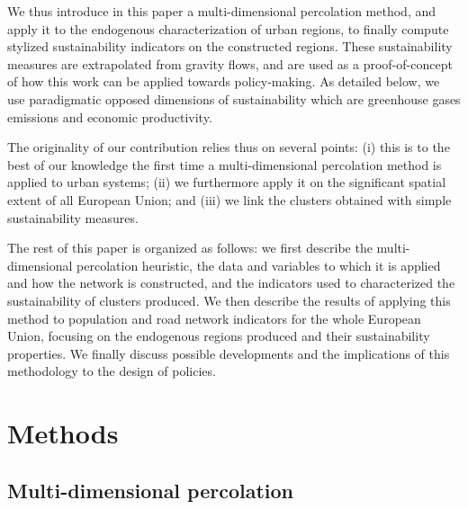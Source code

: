 \documentclass{jimis-en}
\begin{document}
We thus introduce in this paper a multi-dimensional percolation method, and apply it to the endogenous characterization of urban regions, to finally compute stylized sustainability indicators on the constructed regions. These sustainability measures are extrapolated from gravity flows, and are used as a proof-of-concept of how this work can be applied towards policy-making. As detailed below, we use paradigmatic opposed dimensions of sustainability which are greenhouse gases emissions and economic productivity.


The originality of our contribution relies thus on several points: (i) this is to the best of our knowledge the first time a multi-dimensional percolation method is applied to urban systems; (ii) we furthermore apply it on the significant spatial extent of all European Union; and (iii) we link the clusters obtained with simple sustainability measures.


The rest of this paper is organized as follows: we first describe the multi-dimensional percolation heuristic, the data and variables to which it is applied and how the network is constructed, and the indicators used to characterized the sustainability of clusters produced. We then describe the results of applying this method to population and road network indicators for the whole European Union, focusing on the endogenous regions produced and their sustainability properties. We finally discuss possible developments and the implications of this methodology to the design of policies.



\section{Methods}




\subsection{Multi-dimensional percolation}
\end{document}

